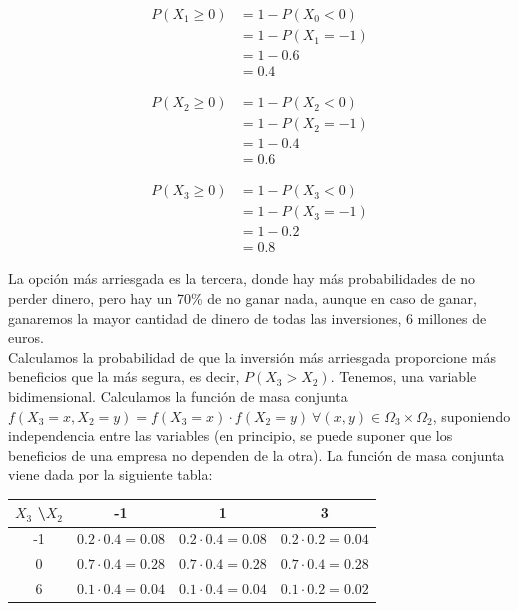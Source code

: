 \documentclass[12pt,a4paper,twoside,openright,titlepage,final]{article}
\begin{document}
\begin{align*}
P(X_1 \geq 0) & = 1 - P(X_0 < 0) \\ & = 1 - P(X_1 = -1) \\ & = 1 - 0.6 \\ & = 0.4
\end{align*}

\begin{align*}
P(X_2 \geq 0) & = 1 - P(X_2 < 0) \\ & = 1 - P(X_2 = -1) \\ & = 1 - 0.4 \\ & = 0.6
\end{align*}

\begin{align*}
P(X_3 \geq 0) & = 1 - P(X_3 < 0) \\ & = 1 - P(X_3 = -1) \\ & = 1 - 0.2 \\ & = 0.8 
\end{align*}

La opción más arriesgada es la tercera, donde hay más probabilidades de no perder dinero, pero hay un 70\% de no ganar nada, aunque en caso de ganar, ganaremos la mayor cantidad de dinero de todas las inversiones, 6 millones de euros.\\

Calculamos la probabilidad de que la inversión más arriesgada proporcione más beneficios que la más segura, es decir, $P(X_3 > X_2)$. Tenemos, una variable bidimensional. Calculamos la función de masa conjunta $f(X_3 = x, X_2 = y) = f(X_3 = x) \cdot f(X_2 = y) \ \forall (x,y) \in \Omega_3 \times \Omega_2$, suponiendo independencia entre las variables (en principio, se puede suponer que los beneficios de una empresa no dependen de la otra). La función de masa conjunta viene dada por la siguiente tabla:

\begin{table}[htbp!]
\centering
\begin{tabular}{cccc}
\hline
$X_3$ \textbackslash $X_2$ & -1                     & 1                      & 3                      \\ \hline
-1                         & $0.2 \cdot 0.4 = 0.08$ & $0.2 \cdot 0.4 = 0.08$ & $0.2 \cdot 0.2 = 0.04$ \\ \hline
0                          & $0.7 \cdot 0.4 = 0.28$ & $0.7 \cdot 0.4 = 0.28$ & $0.7 \cdot 0.4 = 0.28$ \\ \hline
6                          & $0.1 \cdot 0.4 = 0.04$ & $0.1 \cdot 0.4 = 0.04$ & $0.1 \cdot 0.2 = 0.02$ \\ \hline
\end{tabular}
\end{table}
\end{document}
